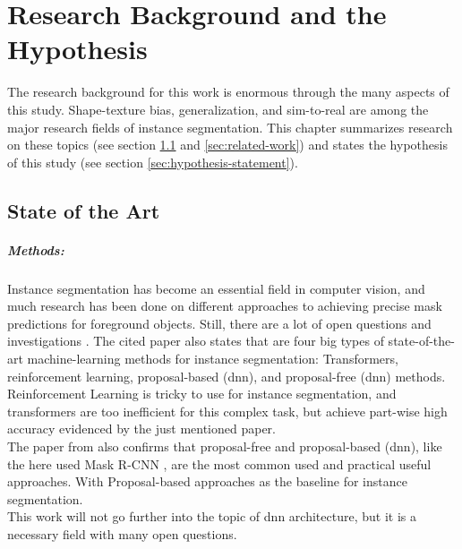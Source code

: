 
\chapter{Research Background and the Hypothesis}
\label{chap:kapitel2}

	The research background for this work is enormous through the many aspects of this study. Shape-texture bias, generalization, and sim-to-real are among the major research fields of instance segmentation. This chapter summarizes research on these topics (see section \ref{sec:state-of-the-art} and \ref{sec:related-work}) and states the hypothesis of this study (see section \ref{sec:hypothesis-statement}).

	\section{State of the Art}
	\label{sec:state-of-the-art}
		\paragraph{Methods:} Instance segmentation has become an essential field in computer vision, and much research has been done on different approaches to achieving precise mask predictions for foreground objects. Still, there are a lot of open questions and investigations \cite{Sharma2022}. The cited paper also states that are four big types of state-of-the-art machine-learning methods for instance segmentation: Transformers, reinforcement learning, proposal-based (\ac{dnn}), and proposal-free (\ac{dnn}) methods.\\
		Reinforcement Learning is tricky to use for instance segmentation, and transformers are too inefficient for this complex task, but achieve part-wise high accuracy evidenced by the just mentioned paper.\\
		The paper from \citeauthor{Sharma2022} also confirms that proposal-free and proposal-based (\ac{dnn}), like the here used Mask R-CNN \cite{Kaiming2017}, are the most common used and practical useful approaches. With Proposal-based approaches as the baseline for instance segmentation.\\
		This work will not go further into the topic of \ac{dnn} architecture, but it is a necessary field with many open questions.
		\clearpage
